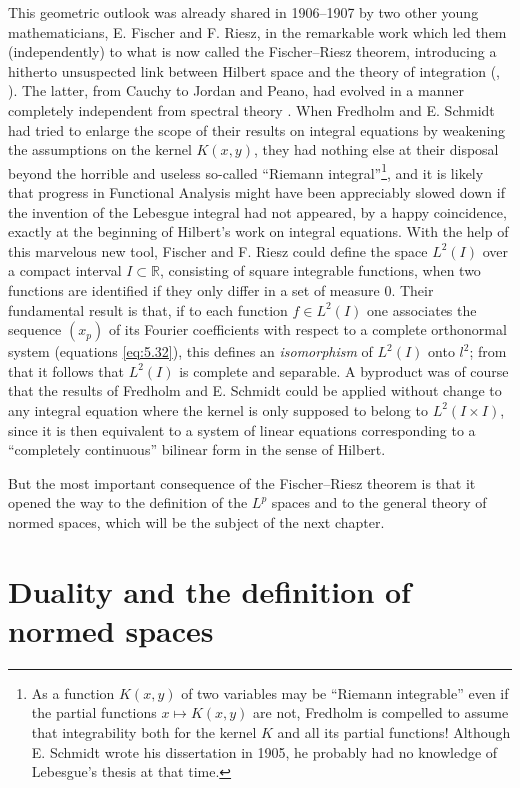 \documentclass[12pt,a4paper,leqno,twoside]{extbook}
\newcommand{\R}{\mathbb{R}}
\begin{document}
This geometric outlook was already shared in 1906--1907 by two other young mathematicians, E. Fischer and F. Riesz, in the remarkable work which led them (independently) to what is now called the Fischer--Riesz theorem, introducing a hitherto unsuspected link between Hilbert space and the theory of integration (\cite{066}, \cite[vol.~I, p.~378--395]{183}). The latter, from Cauchy to Jordan and Peano, had evolved in a manner completely independent from spectral theory \cite{103}. When Fredholm and E. Schmidt had tried to enlarge the scope of their results on integral equations by weakening the assumptions on the kernel \(K(x,y)\), they had nothing else at their disposal beyond the horrible and useless so-called ``Riemann integral''\footnote{As a function \(K(x,y)\) of two variables may be ``Riemann integrable'' even if the partial functions \(x \mapsto K(x,y)\) are not, Fredholm is compelled to assume that integrability both for the kernel \(K\) and all its partial functions! Although E. Schmidt wrote his dissertation in 1905, he probably had no knowledge of Lebesgue's thesis at that time.}, and it is likely that progress in Functional Analysis might have been appreciably slowed down if the invention of the Lebesgue integral had not appeared, by a happy coincidence, exactly at the beginning of Hilbert's work on integral equations. With the help of this marvelous new tool, Fischer and F. Riesz could define the space \(L^2(I)\) over a compact interval \(I \subset \R\), consisting of square integrable functions, when two functions are identified if they only differ in a set of measure 0. Their fundamental result is that, if to each function \(f \in L^2(I)\) one associates the sequence \((x_p)\) of its Fourier coefficients with respect to a complete orthonormal system (equations \eqref{eq:5.32}), this defines an \emph{isomorphism} of \(L^2(I)\) onto \(l^2\); from that it follows that \(L^2(I)\) is complete and separable. A byproduct was of course that the results of Fredholm and E. Schmidt could be applied without change to any integral equation where the kernel is only supposed to belong to \(L^2(I \times I)\), since it is then equivalent to a system of linear equations corresponding to a ``completely continuous'' bilinear form in the sense of Hilbert.

But the most important consequence of the Fischer--Riesz theorem is that it opened the way to the definition of the \(L^p\) spaces and to the general theory of normed spaces, which will be the subject of the next chapter.

\chapter{Duality and the definition of normed spaces}
\label{ch:6}
\setcounter{equation}{0}
\end{document}
